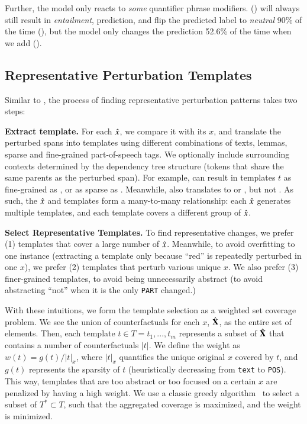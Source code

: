 Further, the model only reacts to \emph{some} quantifier phrase modifiers. 
 () will always still result in \emph{entailment}, prediction,  and  flip the predicted label to \emph{neutral} 90\% of the time (), but the model only changes the prediction 52.6\% of the time when we add  ().


\subsection{Representative Perturbation Templates}
\label{appendix:err_analysis_template}

Similar to \citet{wu2020tempura}, the process of finding representative perturbation patterns takes two steps:

\textbf{Extract template.}
For each $\hat{x}$, we compare it with its $x$, and translate the perturbed spans into templates using different combinations of texts, lemmas, sparse and fine-grained part-of-speech tags.
We optionally include surrounding contexts determined by the dependency tree structure (tokens that share the same parents as the perturbed span).
For example,  can result in templates $t$ as fine-grained as , or as sparse as .
Meanwhile,  also translates to  or , but not .
As such, the $\hat{x}$ and templates form a many-to-many relationship: each $\hat{x}$ generates multiple templates, and each template covers a different group of $\hat{x}$.

\textbf{Select Representative Templates.}
To find representative changes, we prefer (1) templates that cover a large number of $\hat{x}$.
Meanwhile, to avoid overfitting to one instance (\eg extracting a template  only because ``red'' is repeatedly perturbed in one $x$), we prefer (2) templates that perturb various unique $x$.
We also prefer (3) finer-grained templates, to avoid being unnecessarily abstract (\eg to avoid abstracting ``not'' when it is the only \texttt{PART} changed.)


With these intuitions, we form the template selection as a weighted set coverage problem.
We see the union of counterfactuals for each $x$, $\hat{\mathbf{X}}$, as the entire set of elements.
Then, each template $t \in T = {t_1,...,t_m}$ represents a subset of $\hat{\mathbf{X}}$ that contains a number of counterfactuals $|t|$.
We define the weight as $w(t) = g(t) / |t|_x$, where $|t|_x$ quantifies the unique original $x$ covered by $t$, and $g(t)$ represents the sparsity of $t$ (heuristically decreasing from \texttt{text} to \texttt{POS}).
This way, templates that are too abstract or too focused on a certain $x$ are penalized by having a high weight. 
We use a classic greedy algorithm~\cite{vazirani2013approximation} to select a subset of $T^* \subset T$, such that the aggregated coverage is maximized, and the weight is minimized.
